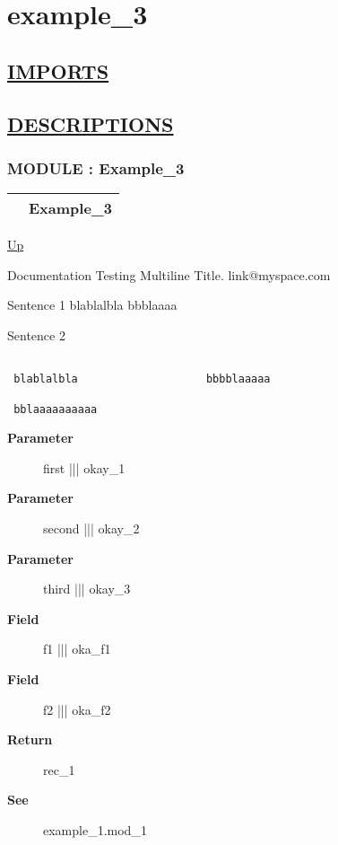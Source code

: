 \chapter*{example\_3}
\hypertarget{ecldoc:toc:example_3}{}

\section*{\underline{IMPORTS}}

\section*{\underline{DESCRIPTIONS}}
\subsection*{MODULE : Example\_3}
\hypertarget{ecldoc:Example_3}{}

{\renewcommand{\arraystretch}{1.5}
\begin{tabularx}{\textwidth}{|>{\raggedright\arraybackslash}l|X|}
\hline
\hspace{0pt} & Example\_3 \\
\hline
\end{tabularx}
}

\hyperlink{ecldoc:toc:root}{Up}

\par
Documentation Testing Multiline Title. link@myspace.com 
\par
 Sentence 1 blablalbla bbblaaaa 


\par
 Sentence 2 


\begin{verbatim}

 blablalbla                    bbbblaaaaa

 bblaaaaaaaaaa
 \end{verbatim}



\par
\begin{description}
\item [\textbf{Parameter}] first ||| okay\_1
\item [\textbf{Parameter}] second ||| okay\_2
\item [\textbf{Parameter}] third ||| okay\_3
\item [\textbf{Field}] f1 ||| oka\_f1
\item [\textbf{Field}] f2 ||| oka\_f2
\item [\textbf{Return}] rec\_1
\item [\textbf{See}] example\_1.mod\_1
\end{description}

